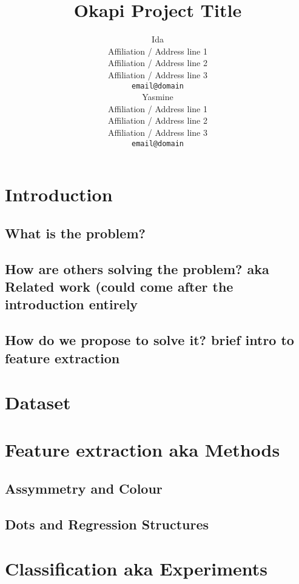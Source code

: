 \documentclass[11pt]{article}
\title{Okapi Project Title}
\author{Ida \\
  Affiliation / Address line 1 \\
  Affiliation / Address line 2 \\
  Affiliation / Address line 3 \\
  {\tt email@domain} \\\And
  Yasmine \\
  Affiliation / Address line 1 \\
  Affiliation / Address line 2 \\
  Affiliation / Address line 3 \\
  {\tt email@domain} \\}
\date{}
\begin{document}
\maketitle

\section{Introduction}

\subsection{What is the problem?}

\subsection{How are others solving the problem? aka Related work (could come after the introduction entirely}

\subsection{How do we propose to solve it? brief intro to feature extraction}





\section{Dataset}




\section{Feature extraction aka Methods}

\subsection{Assymmetry and Colour}

\subsection{Dots and Regression Structures}



\section{Classification aka Experiments}
\end{document}
